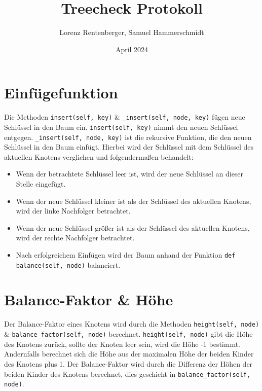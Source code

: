 \documentclass{article}
\title{Treecheck Protokoll}
\author{Lorenz Rentenberger, Samuel Hammerschmidt}
\date{April 2024}
\begin{document}
\maketitle

\section*{Einfügefunktion}
Die Methoden \texttt{insert(self, key)} \& \texttt{\_insert(self, node, key)} fügen neue Schlüssel in den Baum ein. \texttt{insert(self, key)} nimmt den neuen Schlüssel entgegen.
\texttt{\_insert(self, node, key)} ist die rekursive Funktion, die den neuen Schlüssel in den Baum einfügt. Hierbei wird der Schlüssel mit dem Schlüssel des aktuellen Knotens verglichen und folgendermaßen behandelt:
\begin{itemize}
    \item Wenn der betrachtete Schlüssel leer ist, wird der neue Schlüssel an dieser Stelle eingefügt.
    \item Wenn der neue Schlüssel kleiner ist als der Schlüssel des aktuellen Knotens, wird der linke Nachfolger betrachtet.
    \item Wenn der neue Schlüssel größer ist als der Schlüssel des aktuellen Knotens, wird der rechte Nachfolger betrachtet.
    \item Nach erfolgreichem Einfügen wird der Baum anhand der Funktion \texttt{def balance(self, node)} balanciert.
\end{itemize}

\section*{Balance-Faktor \& Höhe}
Der Balance-Faktor eines Knotens wird durch die Methoden \texttt{height(self, node)} \& \texttt{balance\_factor(self, node)} berechnet. \texttt{height(self, node)} gibt die Höhe des Knotens zurück, sollte der Knoten leer sein, wird die Höhe -1 bestimmt.
Andernfalls berechnet sich die Höhe aus der maximalen Höhe der beiden Kinder des Knotens plus 1. Der Balance-Faktor wird durch die Differenz der Höhen der beiden Kinder des Knotens berechnet, dies geschieht in \texttt{balance\_factor(self, node)}.
\end{document}
